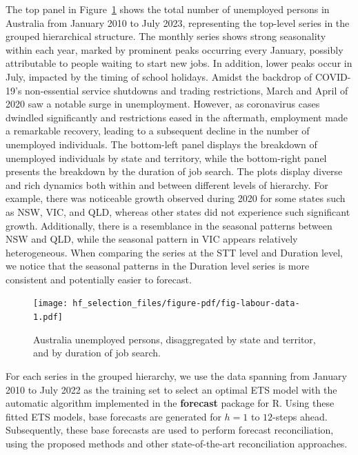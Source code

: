 \documentclass[11pt,a4paper,]{article}
\begin{document}
The top panel in Figure~\ref{fig-labour-data} shows the total number of
unemployed persons in Australia from January 2010 to July 2023,
representing the top-level series in the grouped hierarchical structure.
The monthly series shows strong seasonality within each year, marked by
prominent peaks occurring every January, possibly attributable to people
waiting to start new jobs. In addition, lower peaks occur in July,
impacted by the timing of school holidays. Amidst the backdrop of
COVID-19's non-essential service shutdowns and trading restrictions,
March and April of 2020 saw a notable surge in unemployment. However, as
coronavirus cases dwindled significantly and restrictions eased in the
aftermath, employment made a remarkable recovery, leading to a
subsequent decline in the number of unemployed individuals. The
bottom-left panel displays the breakdown of unemployed individuals by
state and territory, while the bottom-right panel presents the breakdown
by the duration of job search. The plots display diverse and rich
dynamics both within and between different levels of hierarchy. For
example, there was noticeable growth observed during 2020 for some
states such as NSW, VIC, and QLD, whereas other states did not
experience such significant growth. Additionally, there is a resemblance
in the seasonal patterns between NSW and QLD, while the seasonal pattern
in VIC appears relatively heterogeneous. When comparing the series at
the STT level and Duration level, we notice that the seasonal patterns
in the Duration level series is more consistent and potentially easier
to forecast.

\begin{figure}

{\centering \texttt{[image: hf\_selection\_files/figure-pdf/fig-labour-data-1.pdf]}

}

\caption{\label{fig-labour-data}Australia unemployed persons,
disaggregated by state and territor, and by duration of job search.}

\end{figure}

For each series in the grouped hierarchy, we use the data spanning from
January 2010 to July 2022 as the training set to select an optimal ETS
model with the automatic algorithm implemented in the \textbf{forecast}
package for R. Using these fitted ETS models, base forecasts are
generated for \(h=1\) to \(12\)-steps ahead. Subsequently, these base
forecasts are used to perform forecast reconciliation, using the
proposed methods and other state-of-the-art reconciliation approaches.
\end{document}
